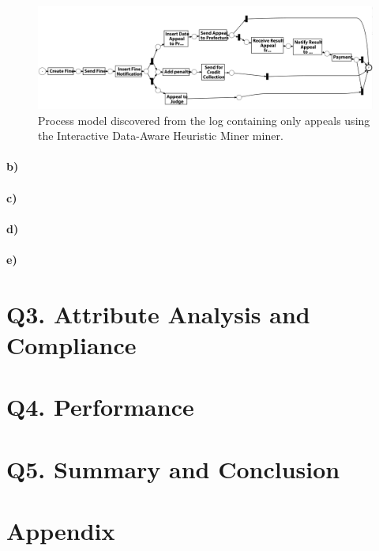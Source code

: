 \documentclass[12pt]{report}
\begin{document}
\begin{figure}[H]
  \centering
  \includegraphics[width=\textwidth]{figures/idhm_appeals.png}
  \caption{Process model discovered from the log containing only appeals using the Interactive Data-Aware Heuristic Miner miner.}
  \label{fig:idhm_appeals}
\end{figure}

\paragraph{\textbf{b)}}

\paragraph{\textbf{c)}}

\paragraph{\textbf{d)}}

\paragraph{\textbf{e)}}

\section{Q3. Attribute Analysis and Compliance}

\section{Q4. Performance}

\section{Q5. Summary and Conclusion}

\section*{Appendix}
\end{document}
